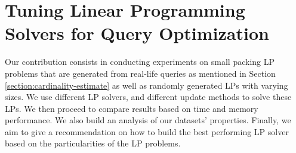 \chapter{Tuning Linear Programming Solvers for Query Optimization}\label{chapter:linearprogramming}

Our contribution consists in conducting experiments on small packing LP problems that are generated from
real-life queries as mentioned in Section \ref{section:cardinality-estimate} as well as randomly generated
LPs with varying sizes. We use different LP solvers, and different update methods to solve these LPs.
We then proceed to compare results based on time and memory performance. We also build an analysis of our
datasets' properties.
Finally, we aim to give a recommendation on how to build the best performing LP solver based on the
particularities of the LP problems.

